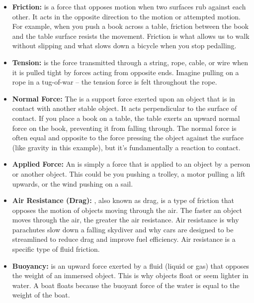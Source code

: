 \begin{itemize}
    \item \textbf{Friction:}   is a force that opposes motion when two surfaces rub against each other.  It acts in the opposite direction to the motion or attempted motion.  For example, when you push a book across a table, friction between the book and the table surface resists the movement.  Friction is what allows us to walk without slipping and what slows down a bicycle when you stop pedalling.

    \item \textbf{Tension:}  is the force transmitted through a string, rope, cable, or wire when it is pulled tight by forces acting from opposite ends.  Imagine pulling on a rope in a tug-of-war – the tension force is felt throughout the rope.

    \item \textbf{Normal Force:}  The  is a support force exerted upon an object that is in contact with another stable object.  It acts perpendicular to the surface of contact.  If you place a book on a table, the table exerts an upward normal force on the book, preventing it from falling through. The normal force is often equal and opposite to the force pressing the object against the surface (like gravity in this example), but it's fundamentally a reaction to contact.

    \item \textbf{Applied Force:}  An  is simply a force that is applied to an object by a person or another object.  This could be you pushing a trolley, a motor pulling a lift upwards, or the wind pushing on a sail.

    \item \textbf{Air Resistance (Drag):}  , also known as drag, is a type of friction that opposes the motion of objects moving through the air.  The faster an object moves through the air, the greater the air resistance.  Air resistance is why parachutes slow down a falling skydiver and why cars are designed to be streamlined to reduce drag and improve fuel efficiency.  Air resistance is a specific type of fluid friction.

    \item \textbf{Buoyancy:}  is an upward force exerted by a fluid (liquid or gas) that opposes the weight of an immersed object.  This is why objects float or seem lighter in water. A boat floats because the buoyant force of the water is equal to the weight of the boat.
\end{itemize}


